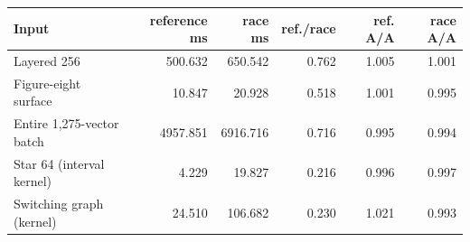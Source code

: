 \begin{center}
\small
\begin{tabular}{lrrrrr}
\toprule
Input & reference ms & race ms & ref./race & ref. A/A & race A/A\\
\midrule
Layered 256 & 500.632 & 650.542 & 0.762 & 1.005 & 1.001\\
Figure-eight surface & 10.847 & 20.928 & 0.518 & 1.001 & 0.995\\
Entire 1,275-vector batch & 4957.851 & 6916.716 & 0.716 & 0.995 & 0.994\\
Star 64 (interval kernel) & 4.229 & 19.827 & 0.216 & 0.996 & 0.997\\
Switching graph (kernel) & 24.510 & 106.682 & 0.230 & 1.021 & 0.993\\
\bottomrule
\end{tabular}
\end{center}
